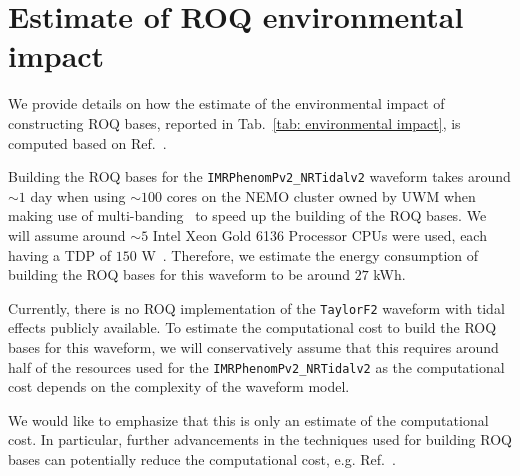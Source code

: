 \documentclass[prd,twocolumn,a4paper,floatfix,nofootinbib,preprintnumbers,superscriptaddress]{revtex4-1}
\begin{document}
\FloatBarrier

\section{Estimate of \ac{ROQ} environmental impact}\label{appendix: ROQ estimate}

We provide details on how the estimate of the environmental impact of constructing \ac{ROQ} bases, reported in Tab.~\ref{tab: environmental impact}, is computed based on Ref.~\cite{Soichiro_mail}.

Building the \ac{ROQ} bases for the \texttt{IMRPhenomPv2\_NRTidalv2} waveform takes around $\sim1$ day when using $\sim100$ cores on the NEMO cluster owned by UWM when making use of multi-banding~\cite{Morisaki:2021ngj} to speed up the building of the \ac{ROQ} bases. We will assume around $\sim5$ Intel Xeon Gold 6136 Processor \acp{CPU} were used, each having a \ac{TDP} of $150$ W~\cite{intel_cpu_datasheet_gold_8380}. Therefore, we estimate the energy consumption of building the \ac{ROQ} bases for this waveform to be around $27$ kWh.

Currently, there is no \ac{ROQ} implementation of the \texttt{TaylorF2} waveform with tidal effects publicly available. To estimate the computational cost to build the \ac{ROQ} bases for this waveform, we will conservatively assume that this requires around half of the resources used for the \texttt{IMRPhenomPv2\_NRTidalv2} as the computational cost depends on the complexity of the waveform model. 

We would like to emphasize that this is only an estimate of the computational cost. In particular, further advancements in the techniques used for building \ac{ROQ} bases can potentially reduce the computational cost, e.g. Ref.~\cite{Morras:2023pug}. 
\end{document}
